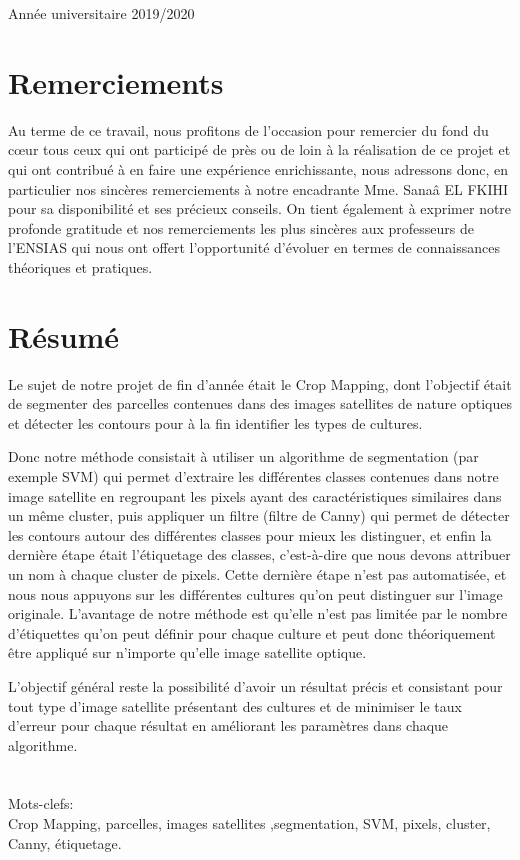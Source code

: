 \documentclass[12pt, openany]{report}
\begin{document}
\begin{titlepage}
\begin{sffamily}
\begin{center}
    \vfill

    {\large Année universitaire 2019/2020}

  \end{center}
  \end{sffamily}
\end{titlepage}
\newpage
\strut 

\chapter*{Remerciements}

Au terme de ce travail, nous profitons de l’occasion pour remercier du fond du cœur tous ceux qui ont participé de près ou de loin à la réalisation de ce projet et qui ont contribué à en faire une expérience enrichissante, nous adressons donc, en particulier nos sincères remerciements à notre encadrante Mme. Sanaâ EL FKIHI pour sa disponibilité et ses précieux conseils.
On tient également à exprimer notre profonde gratitude et nos remerciements les plus sincères aux professeurs de l’ENSIAS qui nous ont offert l’opportunité d’évoluer en termes de connaissances théoriques et pratiques.

\chapter*{Résumé}
Le sujet de notre projet de fin d’année était le Crop Mapping, dont l’objectif était de segmenter des parcelles contenues dans des images satellites de nature optiques et détecter les contours pour à la fin identifier les types de cultures.
\par
Donc notre méthode consistait à utiliser un algorithme de segmentation (par exemple SVM) qui permet d’extraire les différentes classes contenues dans notre image satellite en regroupant les pixels ayant des caractéristiques similaires dans un même cluster, puis appliquer un filtre (filtre de Canny) qui permet de détecter les contours autour des différentes classes pour mieux les distinguer, et enfin la dernière étape était l’étiquetage des classes, c’est-à-dire que nous devons attribuer un nom à chaque cluster de pixels. Cette dernière étape n'est pas automatisée, et nous nous appuyons sur les différentes cultures qu’on peut distinguer sur l'image originale. L’avantage de notre méthode est qu'elle n'est pas limitée par le nombre d'étiquettes qu’on peut définir pour chaque culture et peut donc théoriquement être appliqué sur n’importe qu'elle image satellite optique.
\par
L’objectif général reste la possibilité d’avoir un résultat précis et consistant pour tout type d’image satellite présentant des cultures et de minimiser le taux d’erreur pour chaque résultat en améliorant les paramètres dans chaque algorithme.
\\
\\
\\
Mots-clefs:\\
Crop Mapping, parcelles, images satellites ,segmentation, SVM, pixels, cluster, Canny, étiquetage.
\end{document}
